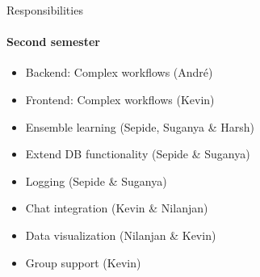 \begin{frame}{Responsibilities}
\framesubtitle{Second semester}
	\begin{itemize}
		\item Backend: Complex workflows (André)
		\item Frontend: Complex workflows (Kevin)
		\item Ensemble learning  (Sepide, Suganya \& Harsh)
		\item Extend DB functionality (Sepide \& Suganya)
		\item Logging (Sepide \& Suganya)
		\item Chat integration (Kevin \& Nilanjan)
		\item Data visualization (Nilanjan \& Kevin)
		\item Group support (Kevin)
	\end{itemize}
\end{frame}